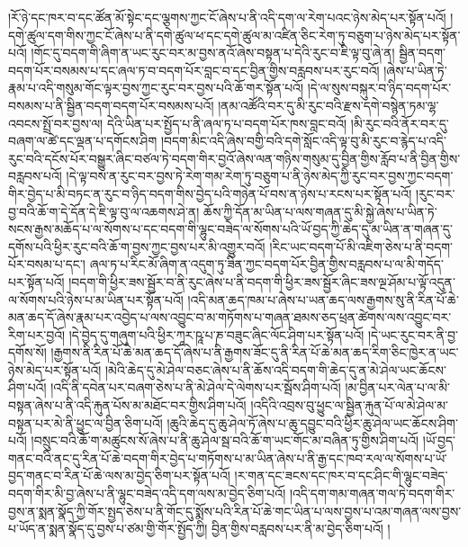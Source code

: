 །རོ་ཉེ་དང་ཁར་བ་དང་ཚོན་མོ་སྟེང་དང་ལྕགས་ཀྱང་ངོ་ཞེས་པ་ནི་འདི་དག་ལ་རེག་པའང་ཉེས་མེད་པར་སྟོན་པའོ། །དགེ་ཚུལ་དག་གིས་ཀྱང་ངོ་ཞེས་པ་ནི་དགེ་ཚུལ་ཕ་དང་དགེ་ཚུལ་མ་འཛིན་ཅིང་རེག་ཏུ་བཅུག་པ་ཉེས་མེད་པར་སྟོན་པའོ། །གོང་དུ་བདག་གི་ཞིག་ན་ཡང་རུང་བར་མ་བྱས་ནའོ་ཞེས་བསྟན་པ་དེའི་རུང་བ་ཇི་ལྟ་བུ་ཞེ་ན། སྦྱིན་བདག་བདག་པོར་བསམས་པ་དང་ཞལ་ཏ་བ་བདག་པོར་བླང་བ་དང་བྱིན་གྱིས་བརླབས་པར་རུང་བའོ། །ཞེས་པ་ཡིན་ཏེ་རྣམ་པ་འདི་གསུམ་གོང་ལྟར་བྱས་ཀྱང་རུང་བར་བྱས་པའི་ཆོ་གར་སྟོན་པའོ། །དེ་ལ་སུས་བསྐུར་བ་ཉིད་བདག་པོར་བསམས་པ་ནི་སྦྱིན་བདག་བདག་པོར་བསམས་པའོ། །ནམ་འཚོའི་བར་དུ་མི་རུང་བའི་རྫས་དགེ་བསྙེན་ཏམ་ལྷ་འབངས་སྤྲོ་བར་བྱས་ལ། དེའི་ཡིན་པར་སྤྱོད་པ་ནི་ཞལ་ཏ་པ་བདག་པོར་ཁས་བླང་བའོ། །མི་རུང་བའི་ནོར་བར་དུ་བཞག་ལ་ཚེ་དང་ལྡན་པ་དགོངས་ཤིག །བདག་མིང་འདི་ཞེས་བགྱི་བའི་དགེ་སློང་འདི་ལྟ་བུ་མི་རུང་བ་རྙེད་པ་འདི་རུང་བའི་དངོས་པོར་བསྒྱུར་ཞིང་བཙལ་ཏེ་བདག་གིར་བྱའོ་ཞེས་ལན་གཉིས་གསུམ་དུ་བྱིན་གྱིས་རློབ་པ་ནི་བྱིན་གྱིས་བརླབས་པའོ། །དེ་ལྟ་བས་ན་རུང་བར་བྱས་ཏེ་རེག་གམ་རེག་ཏུ་བཅུག་པ་ནི་ཉེས་མེད་ཀྱི་རུང་བར་བྱས་ཀྱང་བདག་གིར་བྱེད་པ་མི་བཏང་ན་རུང་བ་ཉིད་བདག་གིས་བྱེད་པའི་གཉེན་པོ་བས་ན་ཉེས་པ་རངས་པར་སྟོན་པའོ། །རུང་བར་བྱ་བའི་ཆོ་ག་དེ་དོན་དེ་ཇི་ལྟ་བུ་ལ་འཆགས་ཤེ་ན། ཆོས་ཀྱི་དོན་མ་ཡིན་པ་ལས་གཞན་དུ་མི་སྐྱེ་ཞེས་པ་ཡིན་ཏེ་སངས་རྒྱས་མཆོད་པ་ལ་སོགས་པ་དང་བདག་གི་ལྷུང་བཟེད་ལ་སོགས་པའི་ཡོ་བྱད་ཀྱི་ཆེད་དུ་མ་ཡིན་ན་གཞན་དུ་དགོས་པའི་ཕྱིར་རུང་བའི་ཆོ་ག་བྱས་ཀྱང་བྱས་པར་མི་འགྱུར་བའོ། །རིང་ཡང་བདག་པོ་མི་འཇིག་ཅེས་པ་ནི་བདག་པོར་བསམ་པ་དང་། ཞལ་ཏ་པ་རིང་མོ་ཞིག་ན་འདུག་ཏུ་ཟིན་ཀྱང་བདག་པོར་བྱིན་གྱིས་བརླབས་པ་ལ་མི་གདོད་པར་སྟོན་པའོ། །བདག་གི་ཕྱིར་ཟས་སྦྱོར་བ་ནི་རུང་ཞེས་པ་ནི་བདག་གི་ཕྱིར་ཟས་སྦྱོར་ཞིང་ཟས་ལྔ་ཤོམ་པ་ལྟོ་འདུན་ལ་སོགས་པའི་ཉེས་པ་མ་ཡིན་པར་སྟོན་པའོ། །འདི་མན་ཆད་ཁམ་པ་ཞེས་པ་ཡན་ཆད་ལས་རྒྱགས་སུ་ནི་རིན་པོ་ཆེ་མན་ཆད་དོ་ཞེས་རྣམ་པར་འབྱེད་པ་ལས་འབྱུང་བ་མ་གཏོགས་པ་གཞན་ཐམས་ཅད་ཕྲན་ཚེགས་ལས་འབྱུང་བར་རིག་པར་བྱའོ། །དེ་བྱེད་དུ་གཞུག་པའི་ཕྱིར་ཀཱར་ཥཱ་པ་ཎ་བཟུང་ཞིང་ལོང་ཤིག་པར་སྟོན་པའོ། །དེ་ཡང་རུང་བར་ནི་བྱ་དགོས་སོ། །རྒྱགས་ནི་རིན་པོ་ཆེ་མན་ཆད་དོ་ཞེས་པ་ནི་རྒྱགས་ཟོང་དུ་ནི་རིན་པོ་ཆེ་མན་ཆད་རིག་ཅིང་ཁྱེར་ན་ཡང་ཉེས་མེད་པར་སྟོན་པའོ། །མེའི་ཆེད་དུ་མེ་ཤེལ་བཅང་ཞེས་པ་ནི་ཆོས་འདི་བདག་གི་ཆེད་དུ་ན་མེ་ཤེལ་ཡང་ཆོངས་ཤིག་པའོ། །འདི་ནི་དབེན་པར་བཞག་ཅེས་པ་ནི་མེ་ཤེལ་དེ་ལེགས་པར་སྦོས་ཤིག་པའོ། །མ་བྱིན་པར་ལེན་པ་ལ་མི་བསྟན་ཞེས་པ་ནི་འདི་རྐུན་པོས་མ་མཐོང་བར་གྱིས་ཤིག་པའོ། །འདིའི་འབྲས་བུ་ཕྱུང་ལ་སྦྱིན་རྐུན་པོ་ལ་མེ་ཤེལ་མ་བསྟན་པར་མེ་ནི་ཕྱུང་ལ་བྱིན་ཅིག་པའོ། །ཆུའི་ཆེད་དུ་ཆུ་ཤེལ་ཏོ་ཞེས་པ་ཆུ་དབྱུང་བའི་ཕྱིར་ཆུ་ཤེལ་ཡང་ཆོངས་ཤིག་པའོ། །བསྲུང་བའི་ཆོ་ག་མཚུངས་སོ་ཞེས་པ་ནི་ཆུ་ཤེལ་སྦ་བའི་ཆོ་ག་ཡང་གོང་མ་བཞིན་ཏུ་གྱིས་ཤིག་པའོ། །ཡོ་བྱད་གནང་བའི་ནང་དུ་རིན་པོ་ཆེ་བདག་གིར་བྱེད་པ་གཏོགས་པ་མ་ཡིན་ཞེས་པ་ནི་རྒྱ་དང་ཁབ་རལ་ལ་སོགས་པ་ཡོ་བྱད་གནང་བ་རིན་པོ་ཆེ་ལས་མ་བྱེད་ཅིག་པར་སྟོན་པའོ། །ར་གན་དང་ཟངས་དང་ཁར་བ་དང་ཤིང་གི་ལྷུང་བཟེད་བདག་གིར་མི་བྱ་ཞེས་པ་ནི་ལྷུང་བཟེད་འདི་དག་ལས་མ་བྱེད་ཅིག་པའོ། །འདི་དག་གམ་གཞན་གལ་ཏེ་བདག་གིར་བྱས་ན་སྨན་སྣོད་ཀྱི་གོར་སྤྱད་ཅེས་པ་ནི་གོང་དུ་སྨོས་པའི་རིན་པོ་ཆེ་གང་ཡིན་པ་ལས་བྱས་པ་འམ་གཞན་ལས་བྱས་པ་ཡོད་ན་སྨན་སྣོད་དུ་བྱས་པ་ཙམ་གྱི་གོར་སྤྱོད་ཀྱི། བྱིན་གྱིས་བརླབས་པར་ནི་མ་བྱེད་ཅིག་པའོ། །
